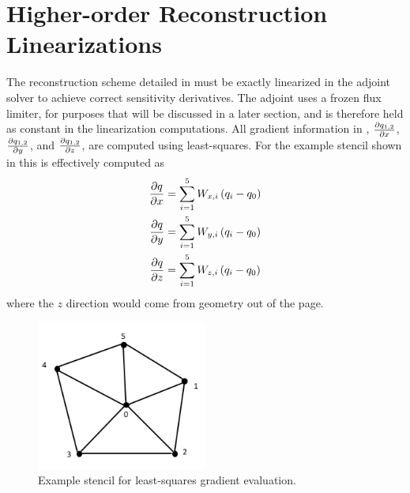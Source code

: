 \section{Higher-order Reconstruction Linearizations}
\label{sec:higher-order-linearizations}

The reconstruction scheme detailed in  must
be exactly linearized in the adjoint solver to achieve correct sensitivity
derivatives. The adjoint uses a frozen flux limiter, for purposes that will be
discussed in a later section, and is therefore held as constant in the
linearization computations.  All gradient information in ,
$\frac{\partial q_{1,2}}{\partial x}$, $\frac{\partial q_{1,2}}{\partial y}$, and $\frac{\partial q_{1,2}}{\partial z}$, are computed using
least-squares.  For the example stencil shown in  this
is effectively computed as
\begin{equation}
  \begin{aligned}
    \frac{\partial q}{\partial x} &= \sum_{i=1}^{5}{W_{x,i}\left( q_i - q_0 \right)} \\
    \frac{\partial q}{\partial y} &= \sum_{i=1}^{5}{W_{y,i}\left( q_i - q_0 \right)} \\
    \frac{\partial q}{\partial z} &= \sum_{i=1}^{5}{W_{z,i}\left( q_i - q_0 \right)}
  \end{aligned}
  \label{grad-construction}
\end{equation}
where the $z$ direction would come from geometry out of the page.
\begin{figure}[h]
  \centering
  \includegraphics[width=0.5\textwidth]{figures/stencil.png}
  \caption{Example stencil for least-squares gradient evaluation.}
  \label{fig:lsq-gradients}
\end{figure}
